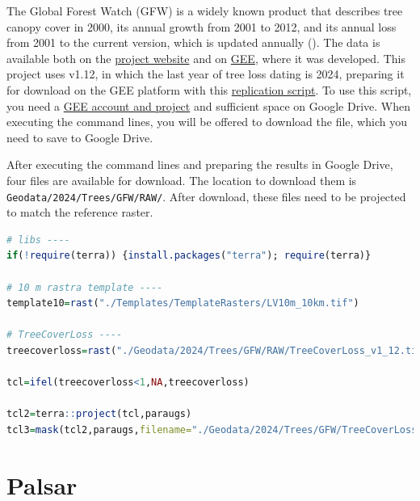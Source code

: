 \documentclass[
]{book}
\newcommand{\passthrough}[1]{#1}
\begin{document}
The Global Forest Watch (GFW) is a widely known product that describes tree
canopy cover in 2000, its annual growth from 2001 to 2012, and its annual
loss from 2001 to the current version, which is updated annually (). The
data is available both on the \href{https://data.globalforestwatch.org/documents/941f17325a494ed78c4817f9bb20f33a/explore}{project website}
and on \href{https://developers.google.com/earth-engine/datasets/catalog/UMD_hansen_global_forest_change_2024_v1_12}{GEE}, where
it was developed. This project uses v1.12, in which the last year of tree loss
dating is 2024, preparing it for download on the GEE platform with
this \href{https://code.earthengine.google.com/4a12b7504ceafe7f422dd7efbe804b67}{replication script}.
To use this script, you need a \href{https://console.cloud.google.com/earth-engine/welcome}{GEE account and project}
and sufficient space on Google Drive. When executing the command lines, you will
be offered to download the file, which you need to save to Google Drive.

After executing the command lines and preparing the results in Google Drive,
four files are available for download. The location to download them is
\passthrough{\lstinline!Geodata/2024/Trees/GFW/RAW/!}. After download, these files need to be projected
to match the reference raster.

\begin{lstlisting}[language=R]
# libs ----
if(!require(terra)) {install.packages("terra"); require(terra)}

# 10 m rastra template ----
template10=rast("./Templates/TemplateRasters/LV10m_10km.tif")

# TreeCoverLoss ----
treecoverloss=rast("./Geodata/2024/Trees/GFW/RAW/TreeCoverLoss_v1_12.tif")

tcl=ifel(treecoverloss<1,NA,treecoverloss)

tcl2=terra::project(tcl,paraugs)
tcl3=mask(tcl2,paraugs,filename="./Geodata/2024/Trees/GFW/TreeCoverLoss_v1_12.tif",overwrite=TRUE)
\end{lstlisting}

\section{Palsar}\label{Ch04.10}
\end{document}
